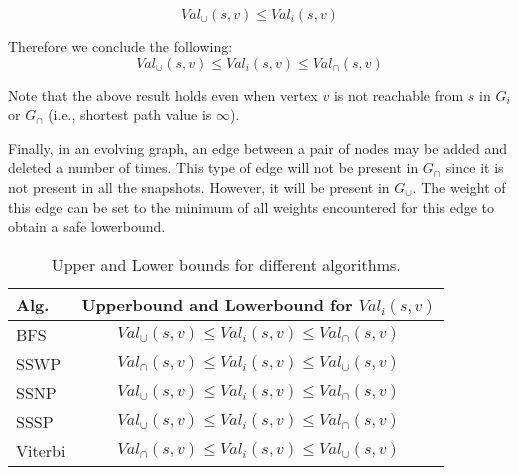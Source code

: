 \vspace{-0.15in}
\[ Val_\cup(s,v) \leq Val_i(s,v) \]

Therefore we conclude the following:
\[ Val_\cup(s,v) \leq Val_i(s,v) \leq Val_\cap(s,v) \]

Note that the above result holds even when vertex $v$ is not reachable from $s$ in $G_i$ or $G_\cap$ (i.e., shortest path value is $\infty$).

Finally, in an evolving graph, an edge between a pair of nodes may be added and deleted a number of times. This type of edge will not be present in $G_{\cap}$ since it is not present in all the snapshots. However, it will be present in $G_{\cup}$. The weight of this edge can be set to the minimum of all weights encountered for this edge to obtain a safe lowerbound. 

\begin{table}[!t]
\vspace{0.05in}
\caption{Upper and Lower bounds for different algorithms.}
\label{UpperboundLowerbound}
\vspace{-0.1in}
\small
\centering
\begin{tabular}{|l|c|} \hline

Alg.
& Upperbound and Lowerbound for $Val_i(s,v)$ \\ \hline \hline

BFS
& $Val_\cup(s,v) \leq Val_i(s,v) \leq Val_\cap(s,v)$ \\ \hline

SSWP
& $Val_\cap(s,v) \leq Val_i(s,v) \leq Val_\cup(s,v)$ \\ \hline

SSNP
& $Val_\cup(s,v) \leq Val_i(s,v) \leq Val_\cap(s,v)$ \\ \hline

SSSP
& $Val_\cup(s,v) \leq Val_i(s,v) \leq Val_\cap(s,v)$ \\ \hline
 
Viterbi
& $Val_\cap(s,v) \leq Val_i(s,v) \leq Val_\cup(s,v)$ \\ \hline

\end{tabular}
\vspace{-0.15in}
\end{table}

